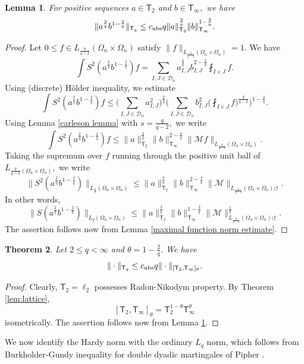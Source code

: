 \documentclass{amsart}
\numberwithin{equation}{section}
\newtheorem{thm}{Theorem}[section]
\newtheorem{lem}[thm]{Lemma}
\theoremstyle{definition}
\theoremstyle{remark}
\newcommand{\1}{\mathbf 1}
\newcommand{\T}{\mathsf T}
\begin{document}
\begin{lem}\label{s7 holder lemma} For positive sequences $a\in\T_2$ and $b\in\T_{\infty},$ we have
$$\|a^{\frac{2}{q}}b^{1-\frac{2}{q}}\|_{\T_q}\leq c_{{\rm abs}}q\|a\|_{\T_2}^{\frac{2}{q}}\|b\|_{\T_{\infty}}^{1-\frac{2}{q}}.$$
\end{lem}
\begin{proof} Let $0\leq f\in L_{\frac{q}{q-2}}(\Omega_n\times\Omega_n)$ satisfy $\|f\|_{L_{\frac{q}{q-2}}(\Omega_n\times\Omega_n)}=1.$ 
We have
$$\int S^2(a^{\frac{2}{q}}b^{1-\frac{2}{q}})f=\sum_{I,J\in\mathcal{D}_n}a_{I,J}^{\frac{4}{q}}b_{I,J}^{2-\frac{4}{q}}\fint_{I\times J}f.$$
Using (discrete) H\"older inequality, we estimate
$$\int S^2(a^{\frac{2}{q}}b^{1-\frac{2}{q}})f\leq \Big(\sum_{I,J\in\mathcal{D}_n}a_{I,J}^2\Big)^{\frac{2}{q}}\Big(\sum_{I,J\in\mathcal{D}_n}b_{I,J}^2\Big(\fint_{I\times J}f\Big)^{\frac{q}{q-2}}\Big)^{1-\frac{2}{q}}.$$
Using Lemma \ref{carleson lemma} with $s=\frac{q}{q-2},$ we write
$$\int S^2(a^{\frac{2}{q}}b^{1-\frac{2}{q}})f\leq \|a\|_{\T_2}^{\frac{4}{q}}\|b\|_{\T_{\infty}}^{2-\frac4q}\|\mathcal{M}f\|_{L_{\frac{q}{q-2}}(\Omega_n\times\Omega_n)}.$$
Taking the supremum over $f$ running through the positive unit ball of $L_{\frac{q}{q-2}(\Omega_n\times\Omega_n)},$ we write
$$\|S^2(a^{\frac{2}{q}}b^{1-\frac{2}{q}})\|_{L_{\frac{q}{2}}(\Omega_n\times\Omega_n)}\leq  \|a\|_{\T_2}^{\frac{4}{q}}\|b\|_{\T_{\infty}}^{2-\frac4q}\|\mathcal{M}\|_{L_{\frac{q}{q-2}}(\Omega_n\times\Omega_n)\circlearrowleft}.$$
In other words,
$$\|S(a^{\frac{2}{q}}b^{1-\frac{2}{q}})\|_{L_q(\Omega_n\times\Omega_n)}\leq  \|a\|_{\T_2}^{\frac{2}{q}}\|b\|_{\T_{\infty}}^{1-\frac2q}\|\mathcal{M}\|_{L_{\frac{q}{q-2}}(\Omega_n\times\Omega_n)\circlearrowleft}^{\frac12}.$$
The assertion follows now from Lemma \ref{maximal function norm estimate}.
\end{proof}

\begin{thm}\label{thm:tent}
Let $2\leq q<\infty$ and $\theta=1-\frac{2}{q}.$ We have
$$\|\cdot\|_{\T_q}\leq c_{{\rm abs}}q\|\cdot\|_{[\T_2,\T_{\infty}]_{\theta}}.$$
\end{thm}
\begin{proof} Clearly, $\T_2=\ell_2$ possesses Radon-Nikodym property. By Theorem \ref{lem:lattice}, 
$$[\T_2,\T_{\infty}]_{\theta}=\T_2^{1-\theta}\T_{\infty}^{\theta}$$
isometrically. The assertion follows now from Lemma \ref{s7 holder lemma}.
\end{proof}

We now identify the Hardy norm with the ordinary $L_q$ norm, which follows from Burkholder-Gundy inequality for double dyadic martingales of Pipher \cite[Euqation (2.4)]{Pip1986}.
\end{document}
